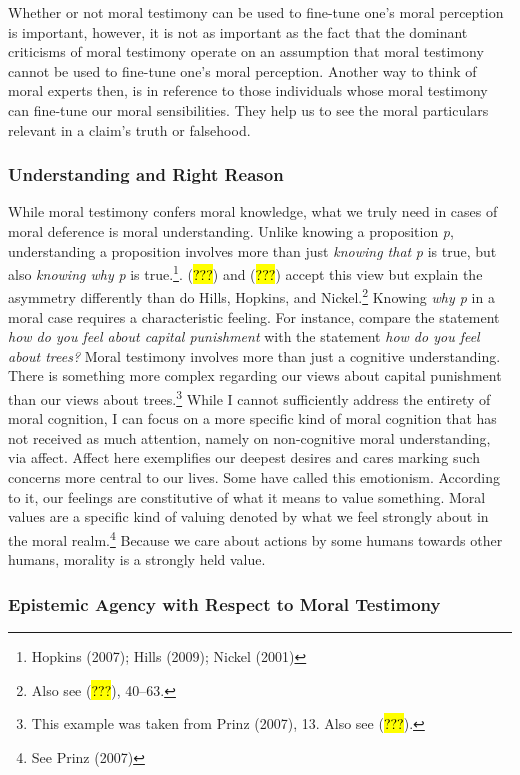 \documentclass[
  letterpaper,
  DIV=11,
  numbers=noendperiod]{scrartcl}
\theoremstyle{remark}
\begin{document}
Whether or not moral testimony can be used to fine-tune one's moral
perception is important, however, it is not as important as the fact
that the dominant criticisms of moral testimony operate on an assumption
that moral testimony cannot be used to fine-tune one's moral perception.
Another way to think of moral experts then, is in reference to those
individuals whose moral testimony can fine-tune our moral sensibilities.
They help us to see the moral particulars relevant in a claim's truth or
falsehood.

\subsubsection{Understanding and Right
Reason}\label{understanding-and-right-reason}

While moral testimony confers moral knowledge, what we truly need in
cases of moral deference is moral understanding. Unlike knowing a
proposition \emph{p}, understanding a proposition involves more than
just \emph{knowing that} \emph{p} is true, but also \emph{knowing why}
\emph{p} is true.\footnote{Hopkins (2007); Hills (2009); Nickel (2001)}.
(\hl{???}) and (\hl{???}) accept this view but explain the asymmetry
differently than do Hills, Hopkins, and Nickel.\footnote{Also see
  (\hl{???}), 40--63.} Knowing \emph{why p} in a moral case requires a
characteristic feeling. For instance, compare the statement \emph{how do
you feel about capital punishment} with the statement \emph{how do you
feel about trees?} Moral testimony involves more than just a cognitive
understanding. There is something more complex regarding our views about
capital punishment than our views about trees.\footnote{This example was
  taken from Prinz (2007), 13. Also see (\hl{???}).} While I cannot
sufficiently address the entirety of moral cognition, I can focus on a
more specific kind of moral cognition that has not received as much
attention, namely on non-cognitive moral understanding, via affect.
Affect here exemplifies our deepest desires and cares marking such
concerns more central to our lives. Some have called this emotionism.
According to it, our feelings are constitutive of what it means to value
something. Moral values are a specific kind of valuing denoted by what
we feel strongly about in the moral realm.\footnote{See Prinz (2007)}
Because we care about actions by some humans towards other humans,
morality is a strongly held value.

\subsubsection{Epistemic Agency with Respect to Moral
Testimony}\label{epistemic-agency-with-respect-to-moral-testimony}
\end{document}
